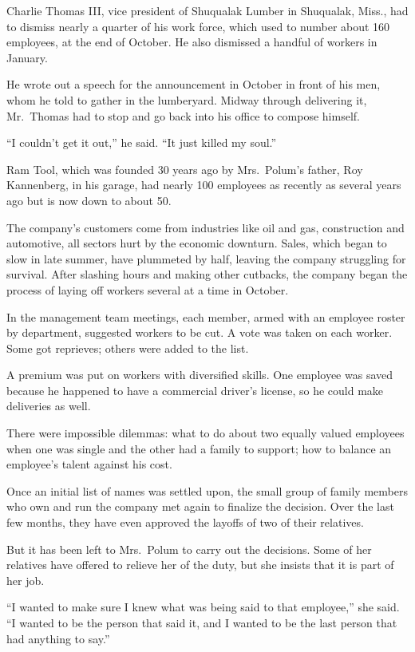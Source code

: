 \documentclass[12pt,a4paper,onecolumn]{article}
\begin{document}
Charlie Thomas III, vice president of Shuqualak Lumber in Shuqualak, Miss., had to dismiss nearly a
quarter of his work force, which used to number about 160 employees, at the end of October. He also
dismissed a handful of workers in January.

He wrote out a speech for the announcement in October in front of his men, whom he told to gather in
the lumberyard. Midway through delivering it, Mr.~Thomas had to stop and go back into his office to
compose himself.

``I couldn't get it out,'' he said. ``It just killed my soul.''

Ram Tool, which was founded 30 years ago by Mrs.~Polum's father, Roy Kannenberg, in his garage, had
nearly 100 employees as recently as several years ago but is now down to about 50.

The company's customers come from industries like oil and gas, construction and automotive, all
sectors hurt by the economic downturn. Sales, which began to slow in late summer, have plummeted by
half, leaving the company struggling for survival. After slashing hours and making other cutbacks,
the company began the process of laying off workers several at a time in October.

In the management team meetings, each member, armed with an employee roster by department, suggested
workers to be cut. A vote was taken on each worker. Some got reprieves; others were added to the
list.

A premium was put on workers with diversified skills. One employee was saved because he happened to
have a commercial driver's license, so he could make deliveries as well.

There were impossible dilemmas: what to do about two equally valued employees when one was single
and the other had a family to support; how to balance an employee's talent against his cost.

Once an initial list of names was settled upon, the small group of family members who own and run
the company met again to finalize the decision. Over the last few months, they have even approved
the layoffs of two of their relatives.

But it has been left to Mrs.~Polum to carry out the decisions. Some of her relatives have offered to
relieve her of the duty, but she insists that it is part of her job.

``I wanted to make sure I knew what was being said to that employee,'' she said. ``I wanted to be
the person that said it, and I wanted to be the last person that had anything to say.''
\end{document}
